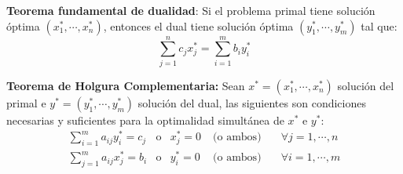 \documentclass[a4paper,oneside,12pt]{amsart}
\newcommand{\xopt}{x^{*}}
\newcommand{\yopt}{y^{*}}
\theoremstyle{definition}
\begin{document}
    \textbf{Teorema fundamental de dualidad}: Si el problema primal tiene solución óptima $(x_1^{\ast},\cdots,x_n^{\ast})$, entonces el dual
    tiene solución óptima $(y_1^{\ast},\cdots,y_m^{\ast})$ tal que:
    \[ \displaystyle \sum_{j=1}^n c_jx_j^{\ast} = \sum_{i=1}^m b_iy_i^{\ast}\]

    \textbf{Teorema de Holgura Complementaria:} Sean $x^{*}=(x_1^{\ast},\cdots,x_n^{\ast})$ solución del primal e
        $y^{*}=(y_1^{\ast},\cdots,y_m^{\ast})$ solución del dual, las siguientes son condiciones necesarias y
suficientes para la optimalidad simultánea de $\xopt$ e $\yopt$:
    \[
    \begin{array}{ccccc}
        \displaystyle \sum_{i=1}^m a_{ij}\yopt_i=c_j & \text{o} & \xopt_j = 0 & \; \text{(o ambos)} \quad & \forall j=1,\cdots,n  \\
        \displaystyle \sum_{j=1}^m a_{ij}\xopt_j=b_i & \text{o} & \yopt_i = 0 & \; \text{(o ambos)} \quad & \forall i=1,\cdots,m  \\
    \end{array} \]
\end{document}
